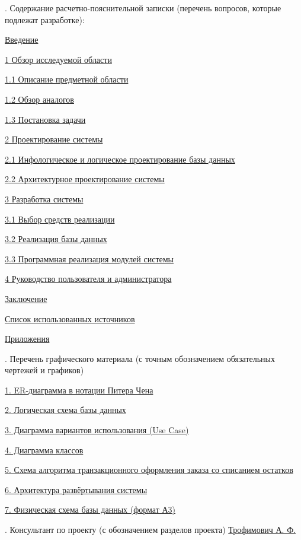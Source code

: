 \smallskip
{}. Содержание расчетно-пояснительной записки (перечень вопросов, которые подлежат разработке):
\begin{description}
  \item \uline{Введение}
  \item \uline{1 Обзор исследуемой области}
  \item \uline{1.1 Описание предметной области}
  \item \uline{1.2 Обзор аналогов}
  \item \uline{1.3 Постановка задачи}
  \item \uline{2 Проектирование системы}
  \item \uline{2.1 Инфологическое и логическое проектирование базы данных}
  \item \uline{2.2 Архитектурное проектирование системы}
  \item \uline{3 Разработка системы}
  \item \uline{3.1 Выбор средств реализации}
  \item \uline{3.2 Реализация базы данных}
  \item \uline{3.3 Программная реализация модулей системы}
  \item \uline{4 Руководство пользователя и администратора}
  \item \uline{Заключение}
  \item \uline{Список использованных источников}
  \item \uline{Приложения}
\end{description}

\smallskip
{}. Перечень графического материала (с точным обозначением обязательных чертежей и графиков)
\begin{description}
  \item \uline{1. ER-диаграмма в нотации Питера Чена}
  \item \uline{2. Логическая схема базы данных}
  \item \uline{3. Диаграмма вариантов использования (Use Case)}
  \item \uline{4. Диаграмма классов}
  \item \uline{5. Схема алгоритма транзакционного оформления заказа со списанием остатков}
  \item \uline{6. Архитектура развёртывания системы}
  \item \uline{7. Физическая схема базы данных (формат А3)}
\end{description}
\smallskip
{}. Консультант по проекту (с обозначением разделов проекта) \uline{Трофимович А. Ф. \hfill}

